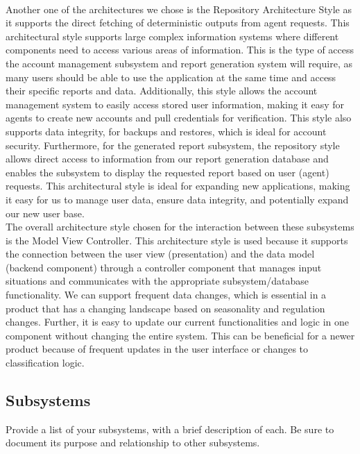\documentclass[]{article}
\begin{document}
\\

Another one of the architectures we chose is the Repository Architecture Style as it supports the direct fetching of deterministic outputs from agent requests. This architectural style supports large complex information systems where different components need to access various areas of information. This is the type of access the account management subsystem and report generation system will require, as many users should be able to use the application at the same time and access their specific reports and data. Additionally, this style allows the account management system to easily access stored user information, making it easy for agents to create new accounts and pull credentials for verification. This style also supports data integrity, for backups and restores, which is ideal for account security. Furthermore, for the generated report subsystem, the repository style allows direct access to information from our report generation database and enables the subsystem to display the requested report based on user (agent) requests. This architectural style is ideal for expanding new applications, making it easy for us to manage user data, ensure data integrity, and potentially expand our new user base.
\\

The overall architecture style chosen for the interaction between these subsystems is the Model View Controller. This architecture style is used because it supports the connection between the user view (presentation) and the data model (backend component) through a controller component that manages input situations and communicates with the appropriate subsystem/database functionality. We can support frequent data changes, which is essential in a product that has a changing landscape based on seasonality and regulation changes. Further, it is easy to update our current functionalities and logic in one component without changing the entire system. This can be beneficial for a newer product because of frequent updates in the user interface or changes to classification logic.  
\\

\subsection{Subsystems}
\label{sub:subsystems}
 Provide a list of your subsystems, with a brief description of each. Be sure to document its purpose and relationship to other subsystems.
\end{document}
